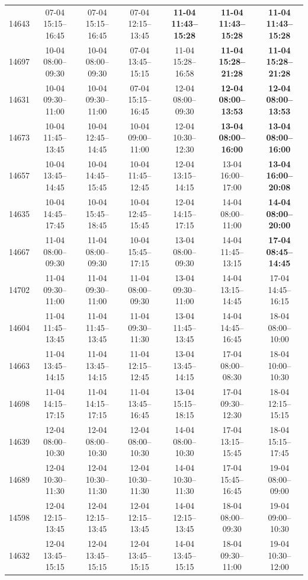 \begin{table}[htbp]
\begin{tabular}{|r|c|c|c|c|c|c|}
14643 & 07-04 15:15--16:45 & 07-04 15:15--16:45 & 07-04 12:15--13:45 & \textbf{11-04 11:43--15:28} & \textbf{11-04 11:43--15:28} & \textbf{11-04 11:43--15:28} \\ 
14697 & 10-04 08:00--09:30 & 10-04 08:00--09:30 & 07-04 13:45--15:15 & 11-04 15:28--16:58 & \textbf{11-04 15:28--21:28} & \textbf{11-04 15:28--21:28} \\ 
14631 & 10-04 09:30--11:00 & 10-04 09:30--11:00 & 07-04 15:15--16:45 & 12-04 08:00--09:30 & \textbf{12-04 08:00--13:53} & \textbf{12-04 08:00--13:53} \\ 
14673 & 10-04 11:45--13:45 & 10-04 12:45--14:45 & 10-04 09:00--11:00 & 12-04 10:30--12:30 & \textbf{13-04 08:00--16:00} & \textbf{13-04 08:00--16:00} \\ 
14657 & 10-04 13:45--14:45 & 10-04 14:45--15:45 & 10-04 11:45--12:45 & 12-04 13:15--14:15 & 13-04 16:00--17:00 & \textbf{13-04 16:00--20:08} \\ 
14635 & 10-04 14:45--17:45 & 10-04 15:45--18:45 & 10-04 12:45--15:45 & 12-04 14:15--17:15 & 14-04 08:00--11:00 & \textbf{14-04 08:00--20:00} \\ 
14667 & 11-04 08:00--09:30 & 11-04 08:00--09:30 & 10-04 15:45--17:15 & 13-04 08:00--09:30 & 14-04 11:45--13:15 & \textbf{17-04 08:45--14:45} \\ 
14702 & 11-04 09:30--11:00 & 11-04 09:30--11:00 & 11-04 08:00--09:30 & 13-04 09:30--11:00 & 14-04 13:15--14:45 & 17-04 14:45--16:15 \\ 
14604 & 11-04 11:45--13:45 & 11-04 11:45--13:45 & 11-04 09:30--11:30 & 13-04 11:45--13:45 & 14-04 14:45--16:45 & 18-04 08:00--10:00 \\ 
14663 & 11-04 13:45--14:15 & 11-04 13:45--14:15 & 11-04 12:15--12:45 & 13-04 13:45--14:15 & 17-04 08:00--08:30 & 18-04 10:00--10:30 \\ 
14698 & 11-04 14:15--17:15 & 11-04 14:15--17:15 & 11-04 13:45--16:45 & 13-04 15:15--18:15 & 17-04 09:30--12:30 & 18-04 12:15--15:15 \\ 
14639 & 12-04 08:00--10:30 & 12-04 08:00--10:30 & 12-04 08:00--10:30 & 14-04 08:00--10:30 & 17-04 13:15--15:45 & 18-04 15:15--17:45 \\ 
14689 & 12-04 10:30--11:30 & 12-04 10:30--11:30 & 12-04 10:30--11:30 & 14-04 10:30--11:30 & 17-04 15:45--16:45 & 19-04 08:00--09:00 \\ 
14598 & 12-04 12:15--13:45 & 12-04 12:15--13:45 & 12-04 12:15--13:45 & 14-04 12:15--13:45 & 18-04 08:00--09:30 & 19-04 09:00--10:30 \\ 
14632 & 12-04 13:45--15:15 & 12-04 13:45--15:15 & 12-04 13:45--15:15 & 14-04 13:45--15:15 & 18-04 09:30--11:00 & 19-04 10:30--12:00 \\ 

\end{tabular}
\end{table}
